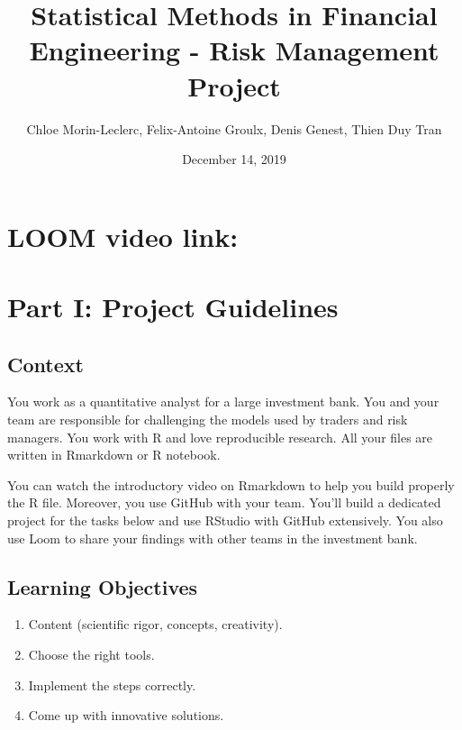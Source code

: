 \documentclass[]{article}
\title{Statistical Methods in Financial Engineering - Risk Management
Project}
\author{Chloe Morin-Leclerc, Felix-Antoine Groulx, Denis Genest,
Thien Duy Tran}
\date{December 14, 2019}
\providecommand{\tightlist}{%
  \setlength{\itemsep}{0pt}\setlength{\parskip}{0pt}}
\begin{document}
\maketitle

\hypertarget{loom-video-link}{%
\section{LOOM video link:}\label{loom-video-link}}

\hypertarget{part-i-project-guidelines}{%
\section{Part I: Project Guidelines}\label{part-i-project-guidelines}}

\hypertarget{context}{%
\subsection{Context}\label{context}}

You work as a quantitative analyst for a large investment bank. You and
your team are responsible for challenging the models used by traders and
risk managers. You work with R and love reproducible research. All your
files are written in Rmarkdown or R notebook.

You can watch the introductory video on Rmarkdown to help you build
properly the R file. Moreover, you use GitHub with your team. You'll
build a dedicated project for the tasks below and use RStudio with
GitHub extensively. You also use Loom to share your findings with other
teams in the investment bank.

\hypertarget{learning-objectives}{%
\subsection{Learning Objectives}\label{learning-objectives}}

\begin{enumerate}
\def\labelenumi{\arabic{enumi}.}
\tightlist
\item
  Content (scientific rigor, concepts, creativity).\\
\item
  Choose the right tools.\\
\item
  Implement the steps correctly.\\
\item
  Come up with innovative solutions.\\
\end{enumerate}
\end{document}
